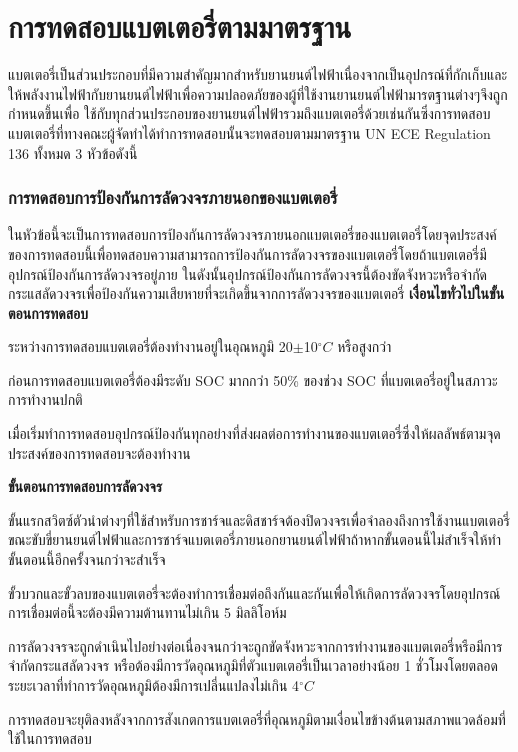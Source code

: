 \chapter{การทดสอบแบตเตอรี่ตามมาตรฐาน}
แบตเตอรี่เป็นส่วนประกอบที่มีความสำคัญมากสำหรับยานยนต์ไฟฟ้าเนื่องจากเป็นอุปกรณ์ที่กักเก็บและให้พลังงานไฟฟ้ากับยานยนต์ไฟฟ้าเพื่อความปลอดภัยของผู้ที่ใช้งานยานยนต์ไฟฟ้ามารตฐานต่างๆจึงถูกกำหนดขึ้นเพื่อ
ใช้กับทุกส่วนประกอบของยานยนต์ไฟฟ้ารวมถึงแบตเตอรี่ด้วยเช่นกันซึ่งการทดสอบแบตเตอรี่ที่ทางคณะผู้จัดทำได้ทำการทดสอบนั้นจะทดสอบตามมาตรฐาน UN ECE Regulation 136 ทั้งหมด 3 หัวข้อดังนี้
\subsection{การทดสอบการป้องกันการลัดวงจรภายนอกของแบตเตอรี่}
ในหัวข้อนี้จะเป็นการทดสอบการป้องกันการลัดวงจรภายนอกแบตเตอรี่ของแบตเตอรี่โดยจุดประสงค์ของการทดสอบนี้เพื่อทดสอบความสามารถการป้องกันการลัดวงจรของแบตเตอรี่โดยถ้าแบตเตอรี่มีอุปกรณ์ป้องกันการลัดวงจรอยู่ภาย
ในดังนั้นอุปกรณ์ป้องกันการลัดวงจรนี้ต้องขัดจังหวะหรือจำกัดกระแสลัดวงจรเพื่อป้องกันความเสียหายที่จะเกิดขึ้นจากการลัดวงจรของแบตเตอรี่
\newline
\newline
\textbf{เงื่อนไขทั่วไปในขั้นตอนการทดสอบ}
\begin{itemize}
{\item ระหว่างการทดสอบแบตเตอรี่ต้องทำงานอยู่ในอุณหภูมิ 20$\pm$10$^{\circ}C$ หรือสูงกว่า}
{\item ก่อนการทดสอบแบตเตอรี่ต้องมีระดับ SOC มากกว่า 50\% ของช่วง SOC ที่แบตเตอรี่อยู่ในสภาวะการทำงานปกติ}
{\item เมื่อเริ่มทำการทดสอบอุปกรณ์ป้องกันทุกอย่างที่ส่งผลต่อการทำงานของแบตเตอรี่ซึ่งให้ผลลัพธ์ตามจุดประสงค์ของการทดสอบจะต้องทำงาน}
\end{itemize}
\textbf{ขั้นตอนการทดสอบการลัดวงจร}
\begin{itemize}
{\item ขั้นแรกสวิตซ์ตัวนำต่างๆที่ใช้สำหรับการชาร์จและดิสชาร์จต้องปิดวงจรเพื่อจำลองถึงการใช้งานแบตเตอรี่ขณะขับขี่ยานยนต์ไฟฟ้าและการชาร์จแบตเตอรี่ภายนอกยานยนต์ไฟฟ้าถ้าหากขั้นตอนนี้ไม่สำเร็จให้ทำขั้นตอนนี้อีกครั้งจนกว่าจะสำเร็จ}
{\item ขั้วบวกและขั้วลบของแบตเตอรี่จะต้องทำการเชื่อมต่อถึงกันและกันเพื่อให้เกิดการลัดวงจรโดยอุปกรณ์การเชื่อมต่อนี้จะต้องมีความต้านทานไม่เกิน 5 มิลลิโอห์ม}
{\item การลัดวงจรจะถูกดำเนินไปอย่างต่อเนื่องจนกว่าจะถูกขัดจังหวะจากการทำงานของแบตเตอรี่หรือมีการจำกัดกระแสลัดวงจร หรือต้องมีการวัดอุณหภูมิที่ตัวแบตเตอรี่เป็นเวลาอย่างน้อย 1 ชั่วโมงโดยตลอดระยะเวลาที่ทำการวัดอุณหภูมิต้องมีการเปลี่นแปลงไม่เกิน 4$^{\circ}C$}
{\item การทดสอบจะยุติลงหลังจากการสังเกตการแบตเตอรี่ที่อุณหภูมิตามเงื่อนไขข้างต้นตามสภาพแวดล้อมที่ใช้ในการทดสอบ}
\end{itemize}
